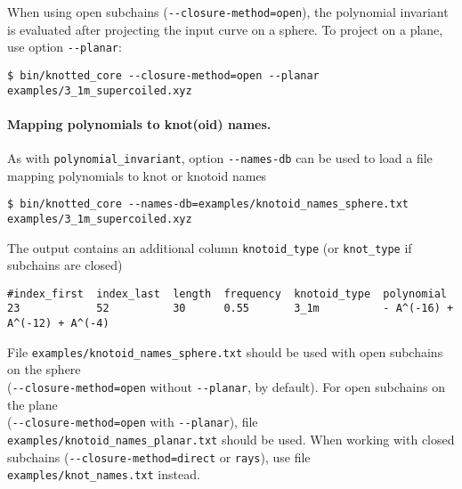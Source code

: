 When using open subchains (\lstinline{--closure-method=open}), the polynomial invariant is evaluated after projecting the input curve on a sphere. To project on a plane, use option \lstinline{--planar}:
\begin{lstlisting}
$ bin/knotted_core --closure-method=open --planar examples/3_1m_supercoiled.xyz
\end{lstlisting}


\paragraph{Mapping polynomials to knot(oid) names.}
As with \lstinline{polynomial_invariant}, option \lstinline{--names-db} can be used to load a file mapping polynomials to knot or knotoid names
\begin{lstlisting}
$ bin/knotted_core --names-db=examples/knotoid_names_sphere.txt examples/3_1m_supercoiled.xyz
\end{lstlisting}
The output contains an additional column \lstinline{knotoid_type} (or \lstinline{knot_type} if subchains are closed)
\begin{lstlisting}
#index_first  index_last  length  frequency  knotoid_type  polynomial
23            52          30      0.55       3_1m          - A^(-16) + A^(-12) + A^(-4)
\end{lstlisting}
File \lstinline{examples/knotoid_names_sphere.txt} should be used with open subchains on the sphere \\
(\lstinline{--closure-method=open} without \lstinline{--planar}, by default). For open subchains on the plane\\
(\lstinline{--closure-method=open} with \lstinline{--planar}), file \lstinline{examples/knotoid_names_planar.txt} should be used. When working with closed subchains (\lstinline{--closure-method=direct} or \lstinline{rays}), use file \lstinline{examples/knot_names.txt} instead.

